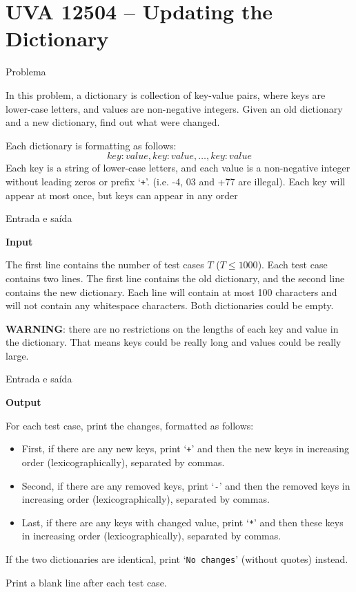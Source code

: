 \section{UVA 12504 -- Updating the Dictionary}

\begin{frame}[fragile]{Problema}

In this problem, a dictionary is collection of key-value pairs, where keys are lower-case letters, 
and values are non-negative integers. Given an old dictionary and a new dictionary, find out what 
were changed.

Each dictionary is formatting as follows:
\[
    {key:value,key:value,\ldots,key:value}
\]
Each key is a string of lower-case letters, and each value is a non-negative integer without leading
zeros or prefix ‘\texttt{+}’. (i.e. -4, 03 and +77 are illegal). Each key will appear at most once, 
but keys can appear in any order

\end{frame}

\begin{frame}[fragile]{Entrada e saída}

\textbf{Input}

The first line contains the number of test cases $T$ ($T\leq 1000$). Each test case contains two 
lines. The first line contains the old dictionary, and the second line contains the new dictionary. Each line will contain at most 100 characters and will not contain any whitespace characters. Both 
dictionaries could be empty.

\textbf{WARNING}: there are no restrictions on the lengths of each key and value in the dictionary. That means keys could be really long and values could be really large.

\end{frame}

\begin{frame}[fragile]{Entrada e saída}

\textbf{Output}

For each test case, print the changes, formatted as follows:
\begin{itemize}
    \item First, if there are any new keys, print ‘\texttt{+}’ and then the new keys in increasing 
        order (lexicographically), separated by commas.
    \item Second, if there are any removed keys, print ‘\texttt{-}’ and then the removed keys in 
        increasing order (lexicographically), separated by commas.
    \item Last, if there are any keys with changed value, print ‘\texttt{*}’ and then these keys 
        in increasing order (lexicographically), separated by commas.
\end{itemize}

If the two dictionaries are identical, print ‘\texttt{No changes}’ (without quotes) instead.

Print a blank line after each test case.
\end{frame}



